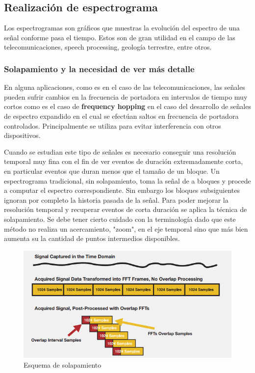 \subsection{Realización de espectrograma}

Los espectrogramas son gráficos que muestras la evolución del espectro de una señal conforme pasa el tiempo. Estos son de gran utilidad en el campo de las telecomunicaciones, speech processing, geología terrestre, entre otros.

\subsubsection{Solapamiento y la necesidad de ver más detalle}
En alguna aplicaciones, como es en el caso de las telecomunicaciones, las señales pueden sufrir cambios en la frecuencia de portadora en intervalos de tiempo muy cortos como es el caso de \textbf{frequency hopping} en el caso del desarrollo de señales de espectro expandido en el cual se efectúan saltos en frecuencia de portadora controlados. Principalmente se utiliza para evitar interferencia con otros dispositivos.

Cuando se estudian este tipo de señales es necesario conseguir una resolución temporal muy fina con el fin de ver eventos de duración extremadamente corta, en particular eventos que duran menos que el tamaño de un bloque. Un espectrograma tradicional, sin solapamiento, toma la señal de a bloques y procede a computar el espectro correspondiente. Sin embargo los bloques subsiguientes ignoran por completo la historia pasada de la señal. Para poder mejorar la resolución temporal y recuperar eventos de corta duración se aplica la técnica de solapamiento. Se debe tener cierto cuidado con la terminología dado que este método no realiza un acercamiento, "zoom", en el eje temporal sino que más bien aumenta su la cantidad de puntos intermedios disponibles. 
  
\begin{figure}[H]
	\centering
	\includegraphics[width=0.7\linewidth]{ImagenesEjercicio7/OverlapDiagram}
	\caption{Esquema de solapamiento}
	\label{fig:overlapdiagram}
\end{figure}

